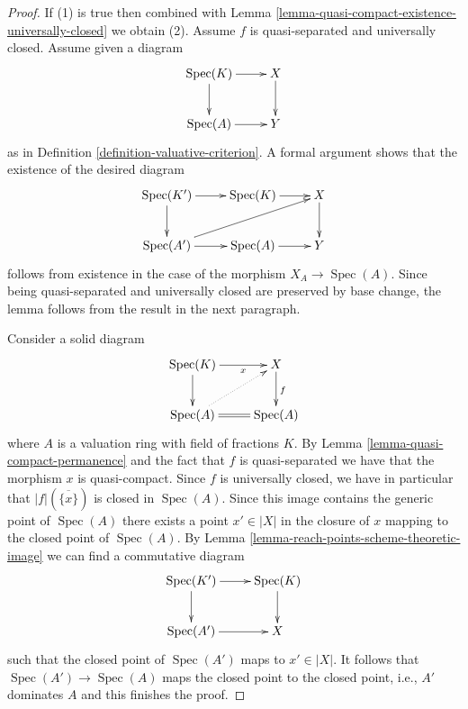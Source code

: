 \documentclass[10pt,a4paper]{amsart}
\theoremstyle{plain}
\theoremstyle{definition}
\theoremstyle{remark}
\numberwithin{equation}{subsection}
\def\Spec{\mathop{\mathrm{Spec}}}
\begin{document}
\begin{proof}
If (1) is true then combined with
Lemma \ref{lemma-quasi-compact-existence-universally-closed}
we obtain (2). Assume $f$ is quasi-separated and universally closed.
Assume given a diagram
$$
\xymatrix{
\Spec(K) \ar[r] \ar[d] & X \ar[d] \\
\Spec(A) \ar[r] & Y
}
$$
as in Definition \ref{definition-valuative-criterion}.
A formal argument shows that the existence of the desired diagram
$$
\xymatrix{
\Spec(K') \ar[r] \ar[d] & \Spec(K) \ar[r] & X \ar[d] \\
\Spec(A') \ar[r] \ar[rru] & \Spec(A) \ar[r] & Y
}
$$
follows from existence in the case of the morphism $X_A \to \Spec(A)$.
Since being quasi-separated and universally closed are preserved
by base change, the lemma follows from the result in the next paragraph.

\medskip\noindent
Consider a solid diagram
$$
\xymatrix{
\Spec(K) \ar[r]_-x \ar[d] & X \ar[d]^f \\
\Spec(A) \ar@{=}[r] \ar@{..>}[ru] & \Spec(A)
}
$$
where $A$ is a valuation ring with field of fractions $K$.
By Lemma \ref{lemma-quasi-compact-permanence} and the fact
that $f$ is quasi-separated we have that
the morphism $x$ is quasi-compact.
Since $f$ is universally closed, we have in particular
that $|f|(\overline{\{x\}})$ is closed in $\Spec(A)$.
Since this image contains the generic point of $\Spec(A)$
there exists a point $x' \in |X|$ in the closure
of $x$ mapping to the closed point of $\Spec(A)$.
By Lemma \ref{lemma-reach-points-scheme-theoretic-image}
we can find a commutative diagram
$$
\xymatrix{
\Spec(K') \ar[r] \ar[d] & \Spec(K) \ar[d] \\
\Spec(A') \ar[r] & X
}
$$
such that the closed point of $\Spec(A')$ maps to $x' \in |X|$.
It follows that $\Spec(A') \to \Spec(A)$ maps the closed point
to the closed point, i.e., $A'$ dominates $A$ and this finishes the proof.
\end{proof}
\end{document}
